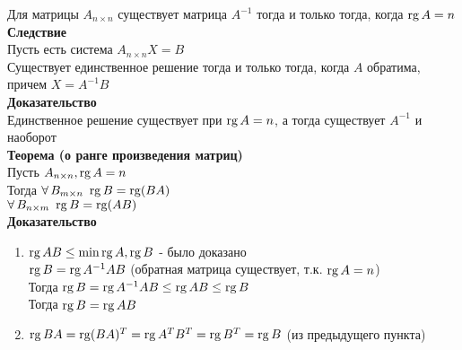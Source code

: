 \documentclass[12pt]{article}
\begin{document}
Для матрицы $A_{n\times n}$ существует матрица $A^{-1}$ тогда и только тогда, когда $\operatorname{rg} A = n$\\
\textbf{Следствие}\\
Пусть есть система $A_{n\times n}X=B$\\
Существует единственное решение тогда и только тогда, когда $A$ обратима, причем $X = A^{-1}B$\\
\textbf{Доказательство}\\
Единственное решение существует при $\operatorname{rg} A = n$, а тогда существует $A^{-1}$ и наоборот\\
\textbf{Теорема (о ранге произведения матриц)}\\
Пусть $A_{n\times n}, \operatorname{rg} A = n$\\
Тогда $\forall\, B_{m\times n}\ \operatorname{rg} B = \operatorname{rg} (BA)$\\
$\forall\, B_{n\times m}\ \operatorname{rg} B = \operatorname{rg} (AB)$\\
\textbf{Доказательство}
\begin{enumerate}
    \item $\operatorname{rg} AB \leq \min \operatorname{rg} A, \operatorname{rg} B$ - было доказано\\
    $\operatorname{rg} B = \operatorname{rg} A^{-1}AB$ (обратная матрица существует, т.к. $\operatorname{rg} A = n$)\\
    Тогда $\operatorname{rg} B = \operatorname{rg} A^{-1}AB \leq \operatorname{rg} AB  \leq \operatorname{rg} B$\\
    Тогда $\operatorname{rg} B = \operatorname{rg} AB$
    \item $\operatorname{rg} BA = \operatorname{rg} (BA)^T = \operatorname{rg} A^TB^T = \operatorname{rg} B^T = \operatorname{rg} B$ (из предыдущего пункта)
\end{enumerate}
\end{document}
